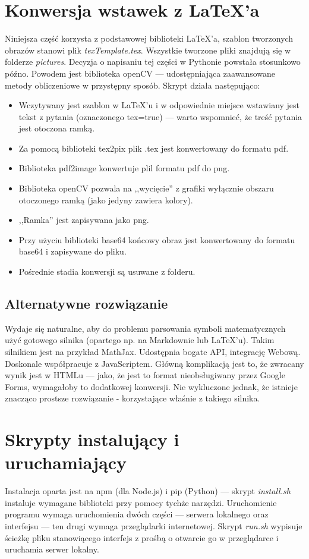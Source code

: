 \section{Konwersja wstawek z \LaTeX{}'a}
Niniejsza część korzysta z podstawowej biblioteki \LaTeX{}'a, szablon tworzonych obrazów stanowi plik \textit{texTemplate.tex}. Wszystkie tworzone pliki znajdują się w folderze \textit{pictures}.
\ind Decyzja o napisaniu tej części w Pythonie powstała stosunkowo późno. Powodem jest biblioteka openCV --- udostępniająca zaawansowane metody obliczeniowe w przystępny sposób. Skrypt działa następująco:
\begin{itemize}
\item Wczytywany jest szablon w \LaTeX{}'u i w odpowiednie miejsce wstawiany jest tekst z pytania (oznaczonego tex=true) --- warto wspomnieć, że treść pytania jest otoczona ramką.
\item Za pomocą biblioteki tex2pix plik .tex jest konwertowany do formatu pdf.
\item Biblioteka pdf2image konwertuje plil formatu pdf do png.
\item Biblioteka openCV pozwala na ,,wycięcie'' z grafiki wyłącznie obszaru otoczonego ramką (jako jedyny zawiera kolory).
\item ,,Ramka'' jest zapisywana jako png.
\item Przy użyciu biblioteki base64 końcowy obraz jest konwertowany do formatu base64 i zapisywane do pliku.
\item Pośrednie stadia konwersji są usuwane z folderu.
\end{itemize}
\subsection{Alternatywne rozwiązanie}%
Wydaje się naturalne, aby do problemu parsowania symboli matematycznych użyć gotowego silnika (opartego np. na Markdownie lub \LaTeX{}'u). Takim silnikiem jest na przykład MathJax. Udostępnia bogate API, integrację Webową. Doskonale współpracuje z JavaScriptem. Główną komplikacją jest to, że zwracany wynik jest w HTMLu --- jako, że jest to format nieobsługiwany przez Google Forms,  wymagałoby to dodatkowej konwersji. Nie wykluczone jednak, że istnieje znacząco prostsze rozwiązanie - korzystające właśnie z takiego silnika.
\section{Skrypty instalujący i uruchamiający}
Instalacja oparta jest na npm (dla Node.js) i pip (Python) --- skrypt \textit{install.sh} instaluje wymagane biblioteki przy pomocy tychże narzędzi.
\ind  Uruchomienie programu wymaga uruchomienia dwóch części --- serwera lokalnego oraz interfejsu --- ten drugi wymaga przeglądarki internetowej. Skrypt \textit{run.sh} wypisuje ścieżkę pliku stanowiącego interfejs z prośbą o otwarcie go w przeglądarce i uruchamia serwer lokalny.










